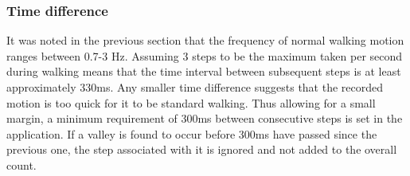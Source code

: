 \documentclass[main.tex]{subfiles}
\begin{document}
\subsubsection{Time difference}

It was noted in the previous section that the frequency of normal walking motion ranges between 0.7-3 Hz. Assuming 3 steps to be the maximum taken per second during walking means that the time interval between subsequent steps is at least approximately 330ms. Any smaller time difference suggests that the recorded motion is too quick for it to be standard walking. Thus allowing for a small margin, a minimum requirement of 300ms between consecutive steps is set in the application. If a valley is found to occur before 300ms have passed since the previous one, the step associated with it is ignored and not added to the overall count.
\end{document}
